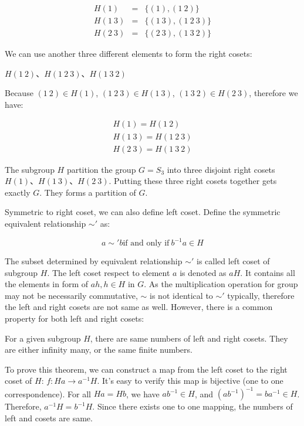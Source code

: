 \documentclass{article}
\begin{document}
\[
\begin{array}{rcl}
H(1) & = & \{(1), (1\ 2)\} \\
H(1\ 3) & = & \{(1\ 3), (1\ 2\ 3)\} \\
H(2\ 3) & = & \{(2\ 3), (1\ 3\ 2)\}
\end{array}
\]

We can use another three different elements to form the right cosets:

$H(1\ 2)$、$H(1\ 2\ 3)$、$H(1\ 3\ 2)$

Because $(1\ 2) \in H(1)$, $(1\ 2\ 3) \in H(1\ 3)$, $(1\ 3\ 2) \in H(2\ 3)$, therefore we have:

\[
\begin{array}{l}
H(1) = H(1\ 2) \\
H(1\ 3) = H(1\ 2\ 3) \\
H(2\ 3) = H(1\ 3\ 2)
\end{array}
\]

The subgroup $H$ partition the group $G = S_3$ into three disjoint right cosets $H(1)$、$H(1\ 3)$、$H(2\ 3)$. Putting these three right cosets together gets exactly $G$. They forms a partition of $G$.

Symmetric to right coset, we can also define left coset. Define the symmetric equivalent relationship $\sim'$ as:

\[
a \sim' b \text{if and only if}\ b^{-1}a \in H
\]

The subset determined by equivalent relationship $\sim'$ is called left coset of subgroup $H$. The left coset respect to element $a$ is denoted as $aH$. It contains all the elements in form of $ah, h \in H$ in $G$. As the multiplication operation for group may not be necessarily commutative, $\sim$ is not identical to $\sim'$ typically, therefore the left and right cosets are not same as well. However, there is a common property for both left and right cosets:

\begin{theorem}
For a given subgroup $H$, there are same numbers of left and right cosets. They are either infinity many, or the same finite numbers.
\end{theorem}

To prove this theorem, we can construct a map from the left coset to the right coset of $H$: $f: Ha \to a^{-1}H$. It's easy to verify this map is bijective (one to one correspondence). For all $Ha = Hb$, we have $ab^{-1} \in H$, and $(ab^{-1})^{-1} = ba^{-1} \in H$. Therefore, $a^{-1}H= b^{-1}H$. Since there exists one to one mapping, the numbers of left and cosets are same.
\end{document}
